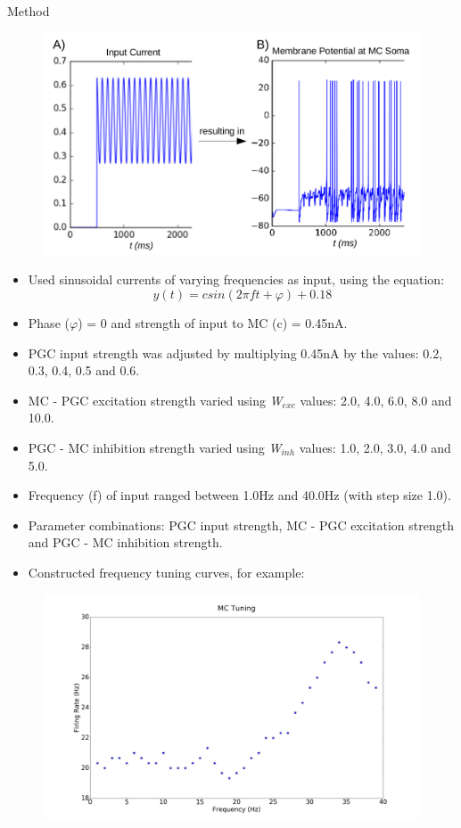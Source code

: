 \documentclass[final,hyperref={pdfpagelabels=false}]{beamer}
\begin{document}
\begin{frame}{}
\begin{columns}[t]
\begin{column}{.48\linewidth}
\begin{block}{Method} 
\begin{figure}
\center
\includegraphics[scale=0.7]{images/Figure2AB}
\end{figure}
\begin{itemize}
\item Used sinusoidal currents of varying frequencies as input, using the equation:
\[
\textit{y}(\textit{t}) = \textit{csin}(\textit{2} \pi \textit{ft} + \varphi) + \textit{0.18}
\]
\item Phase ($\varphi$) = 0 and strength of input to MC (c) = 0.45nA.
\item PGC input strength was adjusted by multiplying 0.45nA by the values: 0.2, 0.3, 0.4, 0.5 and 0.6.
\item MC - PGC excitation strength varied using \textit{W}$_{exc}$ values: 2.0, 4.0, 6.0, 8.0 and 10.0.
\item PGC - MC inhibition strength varied using \textit{W}$_{inh}$ values: 1.0, 2.0, 3.0, 4.0 and 5.0.
\item Frequency (f) of input ranged between 1.0Hz and 40.0Hz (with step size 1.0).
\item Parameter combinations: PGC input strength, MC - PGC excitation strength and PGC - MC inhibition strength.
\item Constructed frequency tuning curves, for example:
\end{itemize}
\begin{figure}
\center
\includegraphics[scale=0.5]{images/Figure2C}
\end{figure}
\end{block}


\end{column}
\end{columns}
\end{frame}
\end{document}
